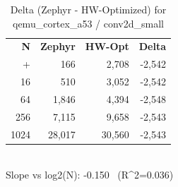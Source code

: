 \begin{table}[tb]
    \centering
    \caption{Delta (Zephyr - HW-Optimized) for qemu_cortex_a53 / conv2d_small}
    \label{tab:delta_qemu_cortex_a53_conv2d_small}
    \scriptsize
    \begin{tabular}{r r r r}
        \hline
        \textbf{N} & \textbf{Zephyr} & \textbf{HW-Opt} & \textbf{Delta} \\\n+        \hline
        4 & 166 & 2,708 & -2,542\\
        16 & 510 & 3,052 & -2,542\\
        64 & 1,846 & 4,394 & -2,548\\
        256 & 7,115 & 9,658 & -2,543\\
        1024 & 28,017 & 30,560 & -2,543\\
        \hline
    \end{tabular}
    \vspace{2mm}\\\n    Slope vs log2(N): -0.150 \ (R^2=0.036)\n\end{table}
